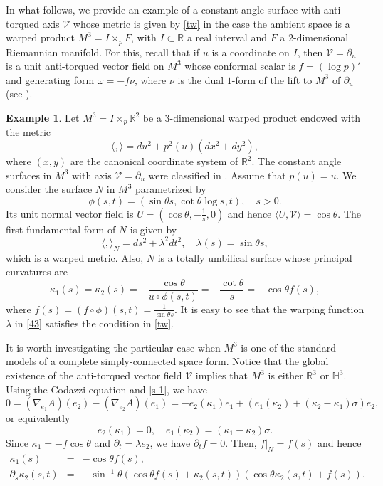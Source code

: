 \documentclass[12pt]{amsart}
\def\r{\mathbb R}
\def\h{\mathbb H}
\def\v{\mathcal V}
\theoremstyle{definition}
\newtheorem{example}[theorem]{Example}
\begin{document}
In what follows, we provide an example of a constant angle surface with anti-torqued axis $\v$ whose metric is given by \eqref{tw} in the case the ambient space is a warped product $M^3=I\times_p F$, with $I\subset \r$ a real interval and $F$ a $2$-dimensional Riemannian manifold. For this, recall that if $u$ is a coordinate on $I$, then $\v=\partial_u$ is a unit anti-torqued vector field on $M^3$ whose conformal scalar is $f=(\log p)'$ and generating form $\omega=-f\nu$, where $\nu$ is the dual $1$-form of the lift to $M^3$ of $\partial_u$ (see \cite[Theorem 3.1]{amc1}).

\begin{example}\label{wapr}
Let $M^3=I\times_p \r^2$ be a $3$-dimensional warped product endowed with the metric 
$$
\langle , \rangle=du^2+p^2(u)(dx^2+dy^2),
$$ 
where $(x,y)$ are the canonical coordinate system of $\r^2$. The constant angle surfaces in $M^3$ with axis $\v=\partial_u$ were classified in \cite{dmvv}. Assume that $p(u)=u$. We consider the surface $N$ in $M^3$ parametrized by 
$$
\phi(s,t)=(\sin \theta s,\cot\theta \log s,t), \quad s>0.
$$
Its unit normal vector field is $U=(\cos\theta,-\frac1s,0)$ and hence $\langle U,\v \rangle=\cos\theta$. The first fundamental form of $N$ is given by
\begin{equation}
\langle , \rangle_N=ds^2+\lambda^2dt^2, \quad \lambda(s)=\sin\theta s, \label{43}
\end{equation}
which is a warped metric. Also, $N$ is a totally umbilical surface whose principal curvatures are
$$
\kappa_1(s)=\kappa_2(s)=-\frac{\cos\theta}{u\circ \phi(s,t)}=-\frac{\cot\theta}{s}=-\cos\theta f(s),
$$
where $f(s)=(f\circ\phi)(s,t)=\frac{1}{\sin \theta s}$. It is easy to see that the warping function $\lambda$ in \eqref{43} satisfies the condition in \eqref{tw}.
\end{example}



It is worth investigating the particular case when $M^3$ is one of the standard models of a complete simply-connected space form. Notice that the global existence of the anti-torqued vector field $\v$ implies that $M^3$ is either $\r^3$ or $\h^3$.
Using the Codazzi equation and \eqref{s-1}, we have
$$
0=(\nabla_{e_1}A)(e_2)-(\nabla_{e_2}A)(e_1)=-e_2(\kappa_1)e_1+(e_1(\kappa_2)+(\kappa_2-\kappa_1)\sigma)e_2,
$$
or equivalently
$$
e_2(\kappa_1)=0, \quad e_1(\kappa_2)=(\kappa_1-\kappa_2)\sigma.
$$
Since $\kappa_1=-f\cos\theta$ and $\partial_t=\lambda e_2$, we have $\partial_t f=0$. Then, $f|_N=f(s)$ and hence
\begin{eqnarray}
\kappa_1(s)&=&-\cos\theta f(s),\label{35}\\ 
\partial_s\kappa_2(s,t)&=&-\sin^{-1}\theta(\cos\theta f(s)+\kappa_2(s,t))(\cos\theta\kappa_2(s,t) +f(s) ) \label{36}.
\end{eqnarray}
\end{document}
